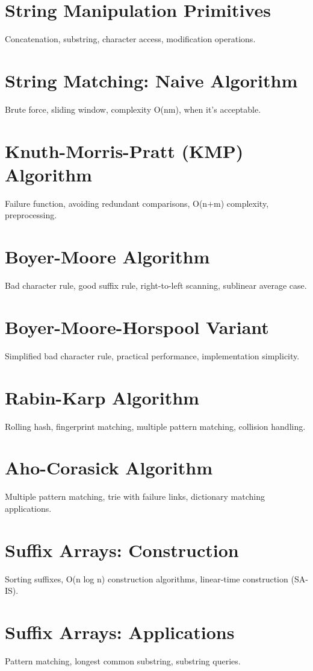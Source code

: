 \chapter{String Manipulation Primitives}
Concatenation, substring, character access, modification operations.

\chapter{String Matching: Naive Algorithm}
Brute force, sliding window, complexity O(nm), when it's acceptable.

\chapter{Knuth-Morris-Pratt (KMP) Algorithm}
Failure function, avoiding redundant comparisons, O(n+m) complexity, preprocessing.

\chapter{Boyer-Moore Algorithm}
Bad character rule, good suffix rule, right-to-left scanning, sublinear average case.

\chapter{Boyer-Moore-Horspool Variant}
Simplified bad character rule, practical performance, implementation simplicity.

\chapter{Rabin-Karp Algorithm}
Rolling hash, fingerprint matching, multiple pattern matching, collision handling.

\chapter{Aho-Corasick Algorithm}
Multiple pattern matching, trie with failure links, dictionary matching applications.

\chapter{Suffix Arrays: Construction}
Sorting suffixes, O(n log n) construction algorithms, linear-time construction (SA-IS).

\chapter{Suffix Arrays: Applications}
Pattern matching, longest common substring, substring queries.

